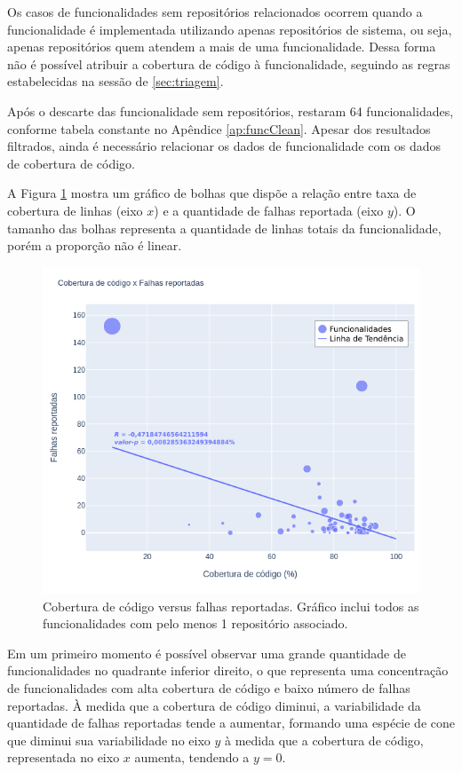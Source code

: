 \documentclass[11.5pt]{article}
\begin{document}
Os casos de funcionalidades sem repositórios relacionados ocorrem quando a funcionalidade é
implementada utilizando apenas repositórios de sistema, ou seja, apenas repositórios quem atendem a
mais de uma funcionalidade.
Dessa forma não é possível atribuir a cobertura de código à funcionalidade, seguindo as regras
estabelecidas na sessão de \ref{sec:triagem}.

Após o descarte das funcionalidade sem repositórios, restaram 64 funcionalidades, conforme
tabela constante no Apêndice \ref{ap:funcClean}.
Apesar dos resultados filtrados, ainda é necessário relacionar os dados de funcionalidade com os
dados de cobertura de código.

A Figura \ref{fig:cc_bugs_geral} mostra um gráfico de bolhas que dispõe a relação entre taxa de
cobertura de linhas (eixo $x$) e a quantidade de falhas reportada (eixo $y$).
O tamanho das bolhas representa a quantidade de linhas totais da funcionalidade, porém a proporção
não é linear.

\begin{figure}[ht]
    \centering
    \includegraphics[width=1.0\textwidth]{cc_bugs_geral.png}
    \caption{Cobertura de código versus falhas reportadas. Gráfico inclui todos as funcionalidades
com pelo menos 1 repositório associado.}
    \label{fig:cc_bugs_geral}
\end{figure}

Em um primeiro momento é possível observar uma grande quantidade de funcionalidades no quadrante
inferior direito, o que representa uma concentração de funcionalidades com alta cobertura de código
e baixo número de falhas reportadas.
À medida que a cobertura de código diminui, a variabilidade da quantidade de falhas reportadas tende
a aumentar, formando uma espécie de cone que diminui sua variabilidade no eixo $y$ à medida que
a cobertura de código, representada no eixo $x$ aumenta, tendendo a $y = 0$.
\end{document}

